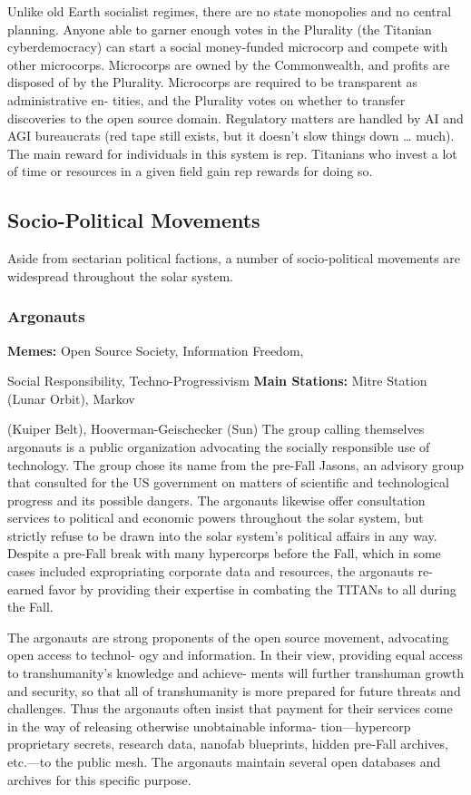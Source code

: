 Unlike old Earth socialist regimes, there are no state 
monopolies and no central planning. Anyone able to 
garner enough votes in the Plurality (the Titanian 
cyberdemocracy) can start a social money-funded 
microcorp and compete with other microcorps. 
Microcorps are owned by the Commonwealth, and 
profits are disposed of by the Plurality. Microcorps 
are required to be transparent as administrative en-
tities, and the Plurality votes on whether to transfer 
discoveries to the open source domain. Regulatory 
matters are handled by AI and AGI bureaucrats (red 
tape still exists, but it doesn't slow things down …
much). The main reward for individuals in this system 
is rep. Titanians who invest a lot of time or resources 
in a given field gain rep rewards for doing so.

\subsection{Socio-Political Movements}

Aside from sectarian political factions, a number of 
socio-political movements are widespread throughout 
the solar system.

\subsubsection{Argonauts}

\textbf{Memes:} Open Source Society, Information Freedom, 

Social Responsibility, Techno-Progressivism
\textbf{Main Stations:} Mitre Station (Lunar Orbit), Markov 

(Kuiper Belt), Hooverman-Geischecker (Sun)
The group calling themselves argonauts is a public 
organization advocating the socially responsible use 
of technology. The group chose its name from the 
pre-Fall Jasons, an advisory group that consulted 
for the US government on matters of scientific and 
technological progress and its possible dangers. The 
argonauts likewise offer consultation services to 
political and economic powers throughout the solar 
system, but strictly refuse to be drawn into the solar 
system's political affairs in any way. Despite a pre-Fall 
break with many hypercorps before the Fall, which in 
some cases included expropriating corporate data and 
resources, the argonauts re-earned favor by providing 
their expertise in combating the TITANs to all during 
the Fall.

The argonauts are strong proponents of the open 
source movement, advocating open access to technol-
ogy and information. In their view, providing equal 
access to transhumanity's knowledge and achieve-
ments will further transhuman growth and security, 
so that all of transhumanity is more prepared for 
future threats and challenges. Thus the argonauts 
often insist that payment for their services come in 
the way of releasing otherwise unobtainable informa-
tion—hypercorp proprietary secrets, research data, 
nanofab blueprints, hidden pre-Fall archives, etc.—to 
the public mesh. The argonauts maintain several open 
databases and archives for this specific purpose.


